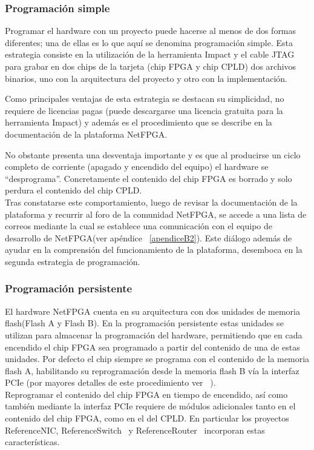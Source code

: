 \subsubsection{Programaci\'on simple}
Programar el hardware con un proyecto puede hacerse al menos de dos formas diferentes; una de ellas es lo que aqu\'i se denomina programaci\'on simple. Esta estrategia consiste en la utilizaci\'on de la herramienta Impact y el cable JTAG para grabar en dos chips de la tarjeta (chip FPGA y chip CPLD) dos archivos binarios, uno con la arquitectura del proyecto y otro con la implementaci\'on.

Como principales ventajas de esta estrategia se destacan su simplicidad, no requiere de licencias pagas (puede descargarse una licencia gratuita para la herramienta Impact) y adem\'as es el procedimiento que se describe en la documentaci\'on de la plataforma NetFPGA.

No obstante presenta una desventaja importante y es que al producirse un ciclo completo de corriente (apagado y encendido del equipo) el hardware se “desprograma”. Concretamente el contenido del chip FPGA es borrado y solo perdura el contenido del chip CPLD.\\

Tras constatarse este comportamiento, luego de revisar la documentaci\'on de la plataforma y recurrir al foro de la comunidad NetFPGA, se accede a una lista de correos mediante la cual se establece una comunicaci\'on con el equipo de desarrollo de NetFPGA(ver ap\'endice ~\ref{apendiceB2}). Este di\'alogo adem\'as de ayudar en la comprensión del funcionamiento de la plataforma, desemboca en la segunda estrategia de programaci\'on.

\subsubsection{Programaci\'on persistente}
El hardware NetFPGA cuenta en su arquitectura con dos unidades de memoria flash(Flash A y Flash B). En la programaci\'on persistente estas unidades se utilizan para almacenar la programaci\'on del hardware, permitiendo que en cada encendido el chip FPGA sea programado a partir del contenido de una de estas unidades. Por defecto el chip siempre se programa con el contenido de la memoria flash A, habilitando su reprogramaci\'on desde la memoria flash B v\'ia la interfaz PCIe (por mayores detalles de este procedimiento ver ~\citep{PCIEProgProject}).\\

Reprogramar el contenido del chip FPGA en tiempo de encendido, así como también mediante la interfaz PCIe requiere de módulos adicionales tanto en el contenido del chip FPGA, como en el del CPLD. En particular los proyectos ReferenceNIC\citep{ReferenceNICProject}, ReferenceSwitch~\citep{ReferenceSwitchProject} y ReferenceRouter~\citep{ReferenceRouterProject} incorporan estas características.\\

